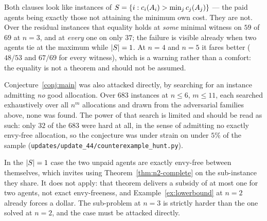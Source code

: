 \begin{remark}
\label{rem:n3-unified-false}
Both clauses look like instances of $S = \left\{i : c_i(A_{i}) >
\min_j c_j(A_{j})\right\}$ --- the paid agents being exactly those not attaining
the minimum own cost. They are not. Over the residual instances that equality
holds at \emph{some} minimal witness on $59$ of $69$ at $n = 3$, and at
\emph{every} one on only $37$; the failure is visible already when two agents tie
at the maximum while $\left\lvert S\right\rvert = 1$. At $n = 4$ and $n = 5$ it fares better
($48/53$ and $67/69$ for every witness), which is a warning rather than a
comfort: the equality is not a theorem and should not be assumed.
\end{remark}

\begin{remark}
\label{rem:no-counterexample}
Conjecture~\ref{conj:main} was also attacked directly, by searching for an
instance admitting \emph{no} good allocation. Over $683$ instances at
$n \le 6$, $m \le 11$, each searched exhaustively over all $n^m$ allocations and
drawn from the adversarial families above, none was found. The power of that
search is limited and should be read as such: only $32$ of the $683$ were hard at
all, in the sense of admitting no exactly envy-free allocation, so the conjecture
was under strain on under $5\%$ of the sample
(\texttt{updates/update\_44/counterexample\_hunt.py}).
\end{remark}

\begin{remark}
\label{rem:n2-no-bootstrap}
In the $\left\lvert S\right\rvert = 1$ case the two unpaid agents are exactly envy-free between
themselves, which invites using Theorem~\ref{thm:n2-complete} on the sub-instance
they share. It does not apply: that theorem delivers a subsidy of at most one for
two agents, not exact envy-freeness, and Example~\ref{ex:lowerbound} at $n = 2$
already forces a dollar. The sub-problem at $n = 3$ is strictly harder than the
one solved at $n = 2$, and the case must be attacked directly.
\end{remark}

